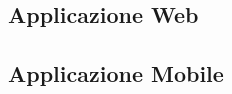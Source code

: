 \subsection{Applicazione Web}\label{sec:AppWeb}


\subsection{Applicazione Mobile}\label{sec:AppMobile}


